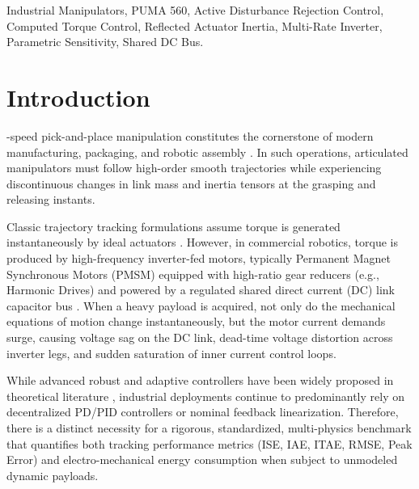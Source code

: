 \documentclass[journal,10pt,twocolumn]{IEEEtran}
\begin{document}
\begin{IEEEkeywords}
Industrial Manipulators, PUMA 560, Active Disturbance Rejection Control, Computed Torque Control, Reflected Actuator Inertia, Multi-Rate Inverter, Parametric Sensitivity, Shared DC Bus.
\end{IEEEkeywords}

\section{Introduction}
-speed pick-and-place manipulation constitutes the cornerstone of modern manufacturing, packaging, and robotic assembly \cite{craig2005introduction}. In such operations, articulated manipulators must follow high-order smooth trajectories while experiencing discontinuous changes in link mass and inertia tensors at the grasping and releasing instants.

Classic trajectory tracking formulations assume torque is generated instantaneously by ideal actuators \cite{spong2020robot}. However, in commercial robotics, torque is produced by high-frequency inverter-fed motors, typically Permanent Magnet Synchronous Motors (PMSM) equipped with high-ratio gear reducers (e.g., Harmonic Drives) and powered by a regulated shared direct current (DC) link capacitor bus \cite{siciliano2008springer}. When a heavy payload is acquired, not only do the mechanical equations of motion change instantaneously, but the motor current demands surge, causing voltage sag on the DC link, dead-time voltage distortion across inverter legs, and sudden saturation of inner current control loops.

While advanced robust and adaptive controllers have been widely proposed in theoretical literature \cite{slotine1991applied, gao2003scaling}, industrial deployments continue to predominantly rely on decentralized PD/PID controllers or nominal feedback linearization. Therefore, there is a distinct necessity for a rigorous, standardized, multi-physics benchmark that quantifies both tracking performance metrics (ISE, IAE, ITAE, RMSE, Peak Error) and electro-mechanical energy consumption when subject to unmodeled dynamic payloads.
\end{document}

